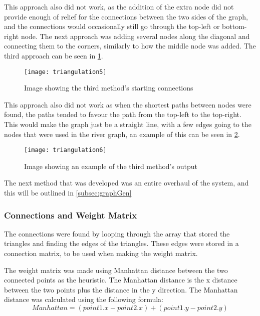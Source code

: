 	This approach also did not work, as the addition of the extra node did not provide enough of relief for the connections between the two sides of the graph, and the connections would occasionally still go through the top-left or bottom-right node.
The next approach was adding several nodes along the diagonal and connecting them to the corners, similarly to how the middle node was added. The third approach can be seen in \ref{fig:triangulation5}.

\begin{figure}[H]
	\texttt{[image: triangulation5]}
	\centering
	\caption{Image showing the third method's starting connections}
	\label{fig:triangulation5}
\end{figure}
	
	This approach also did not work as when the shortest paths between nodes were found, the paths tended to favour the path from the top-left to the top-right. This would make the graph just be a straight line, with a few edges going to the nodes that were used in the river graph, an example of this can be seen in \ref{fig:triangulation6}.

\begin{figure}[H]
	\texttt{[image: triangulation6]}
	\centering
	\caption{Image showing an example of the third method's output}
	\label{fig:triangulation6}
\end{figure}

	The next method that was developed was an entire overhaul of the system, and this will be outlined in \ref{subsec:graphGen}

\subsubsection{Connections and Weight Matrix}
	The connections were found by looping through the array that stored the triangles and finding the edges of the triangles. These edges were stored in a connection matrix, to be used when making the weight matrix.
	\newline
	\par
	The weight matrix was made using Manhattan distance between the two connected points as the heuristic. The Manhattan distance is the x distance between the two points plus the distance in the y direction. The Manhattan distance was calculated using the following formula:\\

$$Manhattan = (point1.x - point2.x) + (point1.y - point2.y)$$
	
